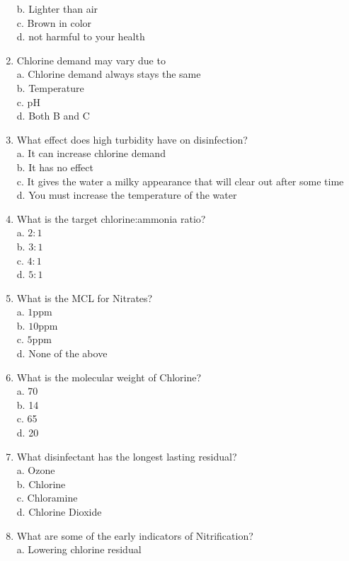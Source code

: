 \begin{enumerate}[1.]
b. Lighter than air\\
c. Brown in color\\
d. not harmful to your health\\
\item Chlorine demand may vary due to\\
a. Chlorine demand always stays the same\\
b. Temperature\\
c. $\mathrm{pH}$\\
d. Both B and C\\
\item What effect does high turbidity have on disinfection?\\
a. It can increase chlorine demand\\
b. It has no effect\\
c. It gives the water a milky appearance that will clear out after some time\\
d. You must increase the temperature of the water\\
\item What is the target chlorine:ammonia ratio?\\
a. $2: 1$\\
b. $3: 1$\\
c. $4: 1$\\
d. $5: 1$\\
\item What is the MCL for Nitrates?\\
a. $1 \mathrm{ppm}$\\
b. $10 \mathrm{ppm}$\\
c. $5 \mathrm{ppm}$\\
d. None of the above\\
\item What is the molecular weight of Chlorine?\\
a. 70\\
b. 14\\
c. 65\\
d. 20\\
\item What disinfectant has the longest lasting residual?\\
a. Ozone\\
b. Chlorine\\
c. Chloramine\\
d. Chlorine Dioxide\\
\item What are some of the early indicators of Nitrification?\\
a. Lowering chlorine residual\\

\end{enumerate}
